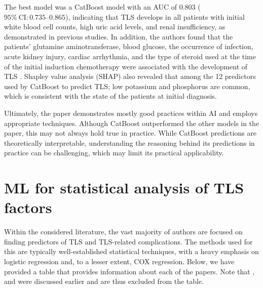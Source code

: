 \documentclass{article}
\begin{document}
The best model was a CatBoost model with an AUC of 0.803 ($95\%\ \text{CI}:0.735\text{–}0.865$), indicating that TLS develops in all patients with initial white blood cell counts, high uric acid levels, and renal insufficiency, as demonstrated in previous studies. In addition, the authors found that the patients’ glutamine aminotransferase, blood glucose, the occurrence of infection, acute kidney injury, cardiac arrhythmia, and the type of steroid used at the time of the initial induction chemotherapy were associated with the development of TLS . Shapley value analysis (SHAP) also revealed that among the 12 predictors used by CatBoost to predict TLS; low potassium and phosphorus are common, which is consistent with the state of the patients at initial diagnosis.

Ultimately, the paper demonstrates mostly good practices within AI and employs appropriate techniques.  Although CatBoost outperformed the other models in the paper, this may not always hold true in practice. While CatBoost predictions are theoretically interpretable, understanding the reasoning behind its predictions in practice can be challenging, which may limit its practical applicability.

\section{ML for statistical analysis of TLS factors}


Within the considered literature, the vast majority of authors are focused on finding predictors of TLS and TLS-related complications. The methods used for this are typically well-established statistical techniques, with a heavy emphasis on logistic regression and, to a lesser extent, COX regression. Below, we have provided a table that provides information about each of the papers. Note that \cite{montesinos2008tumor}, 
\cite{mato2004predictive} and  \cite{xiao2024prediction} were discussed earlier and are thus excluded from the table.
\end{document}
